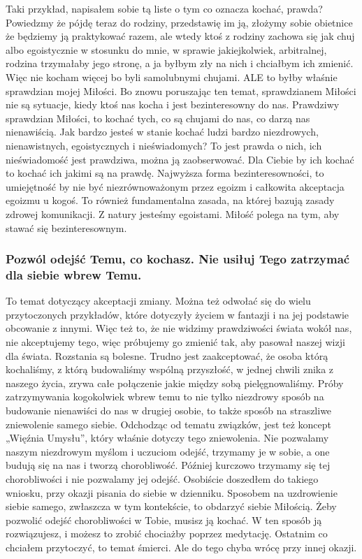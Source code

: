 \documentclass[../dotknieci-miloscia.tex]{subfiles}
\begin{document}
Taki przykład, napisałem sobie tą liste o tym co oznacza kochać, prawda? 
Powiedzmy że pójdę teraz do rodziny, przedstawię im ją, 
złożymy sobie obietnice że będziemy ją praktykować razem, 
ale wtedy ktoś z rodziny zachowa się jak chuj albo egoistycznie w stosunku do mnie, 
w sprawie jakiejkolwiek, arbitralnej,
rodzina trzymałaby jego stronę, a ja byłbym zły na nich i chciałbym ich zmienić. 
Więc nie kocham więcej bo byli samolubnymi chujami. 
ALE to byłby właśnie sprawdzian mojej Miłości. 
Bo znowu poruszając ten temat, 
sprawdzianem Miłości nie są sytuacje, kiedy ktoś nas kocha i jest bezinteresowny do nas. 
Prawdziwy sprawdzian Miłości, to kochać tych, co są chujami do nas, co darzą nas nienawiścią. 
Jak bardzo jesteś w stanie kochać ludzi bardzo niezdrowych, nienawistnych, egoistycznych i nieświadomych? 
To jest prawda o nich, ich nieświadomość jest prawdziwa, można ją zaobserwować. 
Dla Ciebie by ich kochać to kochać ich jakimi są na prawdę. 
Najwyższa forma bezinteresowności, 
to umiejętność by nie być niezrównoważonym przez egoizm i całkowita akceptacja egoizmu u kogoś. 
To również fundamentalna zasada, na której bazują zasady zdrowej komunikacji. 
Z natury jesteśmy egoistami. 
Miłość polega na tym, aby stawać się bezinteresownym.

\subsubsection{Pozwól odejść Temu, co kochasz. Nie usiłuj Tego zatrzymać dla siebie wbrew Temu.}
To temat dotyczący akceptacji zmiany. 
Można też odwołać się do wielu przytoczonych przykładów, 
które dotyczyły życiem w fantazji i na jej podstawie obcowanie z innymi. 
Więc też to, że nie widzimy prawdziwości świata wokół nas, 
nie akceptujemy tego, więc próbujemy go zmienić tak, aby pasował naszej wizji dla świata. 
Rozstania są bolesne. 
Trudno jest zaakceptować, że osoba którą kochaliśmy, 
z którą budowaliśmy wspólną przyszłość, 
w jednej chwili znika z naszego życia, 
zrywa całe połączenie jakie między sobą pielęgnowaliśmy. 
Próby zatrzymywania kogokolwiek wbrew temu 
to nie tylko niezdrowy sposób na budowanie nienawiści do nas w drugiej osobie, 
to także sposób na straszliwe zniewolenie samego siebie. 
Odchodząc od tematu związków, jest też koncept „Więźnia Umysłu”, który właśnie dotyczy tego zniewolenia. 
Nie pozwalamy naszym niezdrowym myślom i uczuciom odejść, 
trzymamy je w sobie, a one budują się na nas i tworzą chorobliwość. 
Później kurczowo trzymamy się tej chorobliwości i nie pozwalamy jej odejść. 
Osobiście doszedłem do takiego wniosku, przy okazji pisania do siebie w dzienniku. 
Sposobem na uzdrowienie siebie samego, zwłaszcza w tym kontekście, to obdarzyć siebie Miłością. 
Żeby pozwolić odejść chorobliwości w Tobie, musisz ją kochać. 
W ten sposób ją rozwiązujesz, i możesz to zrobić chociażby poprzez medytację. 
Ostatnim co chciałem przytoczyć, to temat śmierci.
Ale do tego chyba wrócę przy innej okazji. 
\end{document}
